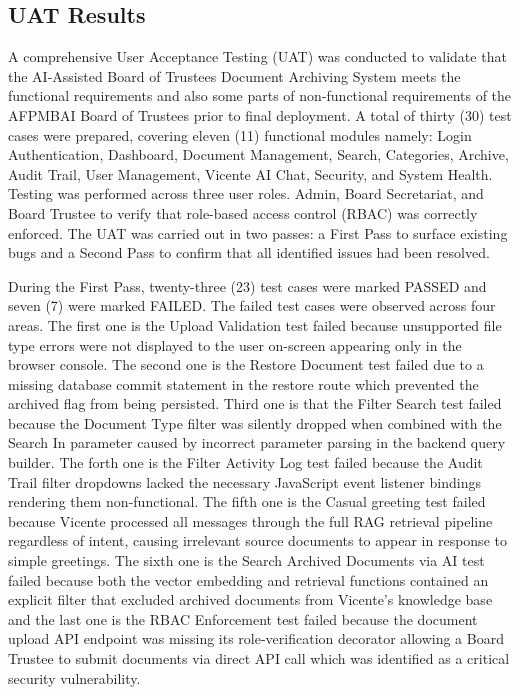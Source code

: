  \subsection{UAT Results}
     A comprehensive User Acceptance Testing (UAT) was conducted to validate that the AI-Assisted Board of Trustees Document Archiving System meets the functional  requirements and also some parts of non-functional requirements of the AFPMBAI Board of Trustees prior to final deployment. A total of thirty (30) test cases were prepared, covering eleven (11) functional modules namely: Login Authentication, Dashboard, Document Management, Search, Categories, Archive, Audit Trail, User Management, Vicente AI Chat, Security, and System Health. Testing was performed across three user roles. Admin, Board Secretariat, and Board Trustee to verify that role-based access control (RBAC) was correctly enforced. The UAT was carried out in two passes: a First Pass to surface existing bugs and a Second Pass to confirm that all identified issues had been resolved.

During the First Pass, twenty-three (23) test cases were marked PASSED and seven (7) were marked FAILED. The failed test cases were observed across four areas. The first one is the Upload Validation test failed because unsupported file type errors were not displayed to the user on-screen appearing only in the browser console. The second one is the Restore Document test failed due to a missing database commit statement in the restore route which prevented the archived flag from being persisted. Third one is that the Filter Search test failed because the Document Type filter was silently dropped when combined with the Search In parameter caused by incorrect parameter parsing in the backend query builder. The forth one is  the Filter Activity Log test failed because the Audit Trail filter dropdowns lacked the necessary JavaScript event listener bindings rendering them non-functional. The fifth one is the Casual greeting test failed because Vicente processed all messages through the full RAG retrieval pipeline regardless of intent, causing irrelevant source documents to appear in response to simple greetings. The sixth one is the Search Archived Documents via AI test failed because both the vector embedding and retrieval functions contained an explicit filter that excluded archived documents from Vicente's knowledge base and the last one is the RBAC Enforcement test failed because the document upload API endpoint was missing its role-verification decorator allowing a Board Trustee to submit documents via direct API call which was identified as a critical security vulnerability.

